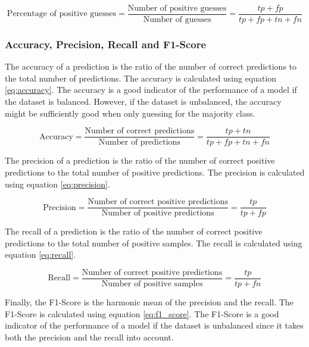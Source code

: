 \begin{equation}
    \label{eq:percentage_of_positive_guesses}
    \text{Percentage of positive guesses} = \frac{\text{Number of positive guesses}}{\text{Number of guesses}} = \frac{tp + fp}{tp + fp + tn + fn}
\end{equation}

\subsubsection{Accuracy, Precision, Recall and F1-Score}

The accuracy of a prediction is the ratio of the number of correct predictions to the total number of predictions. The accuracy is calculated using equation \ref{eq:accuracy}. The accuracy is a good indicator of the performance of a model if the dataset is balanced. However, if the dataset is unbalanced, the accuracy might be sufficiently good when only guessing for the majority class. 

\begin{equation}
    \label{eq:accuracy}
    \text{Accuracy} = \frac{\text{Number of correct predictions}}{\text{Number of predictions}} = \frac{tp + tn}{tp + fp + tn + fn}
\end{equation}

The precision of a prediction is the ratio of the number of correct positive predictions to the total number of positive predictions. The precision is calculated using equation \ref{eq:precision}.

\begin{equation}
    \label{eq:precision}
    \text{Precision} = \frac{\text{Number of correct positive predictions}}{\text{Number of positive predictions}} = \frac{tp}{tp + fp}
\end{equation}

The recall of a prediction is the ratio of the number of correct positive predictions to the total number of positive samples. The recall is calculated using equation \ref{eq:recall}.

\begin{equation}
    \label{eq:recall}
    \text{Recall} = \frac{\text{Number of correct positive predictions}}{\text{Number of positive samples}} = \frac{tp}{tp + fn}
\end{equation}

Finally, the F1-Score is the harmonic mean of the precision and the recall. The F1-Score is calculated using equation \ref{eq:f1_score}. The F1-Score is a good indicator of the performance of a model if the dataset is unbalanced since it takes both the precision and the recall into account.

